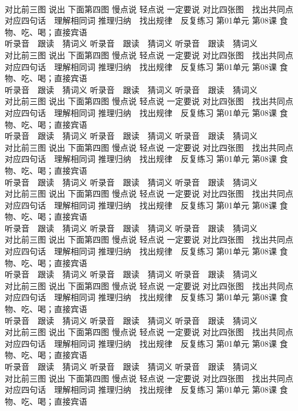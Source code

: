 \documentclass[8pt]{extreport}
\begin{document}
\begin{CJK}{UTF8}{min}
\\	对比前三图 说出 下面第四图 慢点说 轻点说 一定要说	对比四张图　找出共同点 对应四句话　理解相同词 推理归纳　找出规律　反复练习 第01单元 第08课 食物、吃、喝；直接宾语
\\	听录音　跟读　猜词义 听录音　跟读　猜词义 听录音　跟读　猜词义 
\\	对比前三图 说出 下面第四图 慢点说 轻点说 一定要说	对比四张图　找出共同点 对应四句话　理解相同词 推理归纳　找出规律　反复练习 第01单元 第08课 食物、吃、喝；直接宾语
\\	听录音　跟读　猜词义 听录音　跟读　猜词义 听录音　跟读　猜词义 
\\	对比前三图 说出 下面第四图 慢点说 轻点说 一定要说	对比四张图　找出共同点 对应四句话　理解相同词 推理归纳　找出规律　反复练习 第01单元 第08课 食物、吃、喝；直接宾语
\\	听录音　跟读　猜词义 听录音　跟读　猜词义 听录音　跟读　猜词义 
\\	对比前三图 说出 下面第四图 慢点说 轻点说 一定要说	对比四张图　找出共同点 对应四句话　理解相同词 推理归纳　找出规律　反复练习 第01单元 第08课 食物、吃、喝；直接宾语
\\	听录音　跟读　猜词义 听录音　跟读　猜词义 听录音　跟读　猜词义 
\\	对比前三图 说出 下面第四图 慢点说 轻点说 一定要说	对比四张图　找出共同点 对应四句话　理解相同词 推理归纳　找出规律　反复练习 第01单元 第08课 食物、吃、喝；直接宾语
\\	听录音　跟读　猜词义 听录音　跟读　猜词义 听录音　跟读　猜词义 
\\	对比前三图 说出 下面第四图 慢点说 轻点说 一定要说	对比四张图　找出共同点 对应四句话　理解相同词 推理归纳　找出规律　反复练习 第01单元 第08课 食物、吃、喝；直接宾语
\\	听录音　跟读　猜词义 听录音　跟读　猜词义 听录音　跟读　猜词义 
\\	对比前三图 说出 下面第四图 慢点说 轻点说 一定要说	对比四张图　找出共同点 对应四句话　理解相同词 推理归纳　找出规律　反复练习 第01单元 第08课 食物、吃、喝；直接宾语
\\	听录音　跟读　猜词义 听录音　跟读　猜词义 听录音　跟读　猜词义 
\\	对比前三图 说出 下面第四图 慢点说 轻点说 一定要说	对比四张图　找出共同点 对应四句话　理解相同词 推理归纳　找出规律　反复练习 第01单元 第08课 食物、吃、喝；直接宾语
\\	听录音　跟读　猜词义 听录音　跟读　猜词义 听录音　跟读　猜词义 
\\	对比前三图 说出 下面第四图 慢点说 轻点说 一定要说	对比四张图　找出共同点 对应四句话　理解相同词 推理归纳　找出规律　反复练习 第01单元 第08课 食物、吃、喝；直接宾语

\end{CJK}
\end{document}
